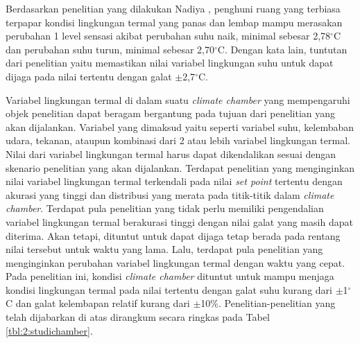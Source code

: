 Berdasarkan penelitian yang dilakukan Nadiya \cite{skripsiMuna}, penghuni ruang yang terbiasa terpapar kondisi lingkungan termal yang panas dan lembap mampu merasakan perubahan 1 level sensasi akibat perubahan suhu naik, minimal sebesar 2,78$^{\circ}$C dan perubahan suhu turun, minimal sebesar 2,70$^{\circ}$C. Dengan kata lain, tuntutan dari penelitian yaitu memastikan nilai variabel lingkungan suhu untuk dapat dijaga pada nilai tertentu dengan galat $\pm$2,7$^{\circ}$C. 

Variabel lingkungan termal di dalam suatu \textit{climate chamber} yang mempengaruhi objek penelitian dapat beragam bergantung pada tujuan dari penelitian yang akan dijalankan. Variabel yang dimaksud yaitu seperti variabel suhu, kelembaban udara, tekanan, ataupun kombinasi dari 2 atau lebih variabel lingkungan termal. Nilai dari variabel lingkungan termal harus dapat dikendalikan sesuai dengan skenario penelitian yang akan dijalankan. Terdapat penelitian yang menginginkan nilai variabel lingkungan termal terkendali pada nilai \textit{set point} tertentu dengan akurasi yang tinggi dan distribusi yang merata pada titik-titik dalam \textit{climate chamber}. Terdapat pula penelitian yang tidak perlu memiliki pengendalian variabel lingkungan termal berakurasi tinggi dengan nilai galat yang masih dapat diterima. Akan tetapi, dituntut untuk dapat dijaga tetap berada pada rentang nilai tersebut untuk waktu yang lama. Lalu, terdapat pula penelitian yang menginginkan perubahan variabel lingkungan termal dengan waktu yang cepat. Pada penelitian ini, kondisi \textit{climate chamber} dituntut untuk mampu menjaga kondisi lingkungan termal pada nilai tertentu dengan galat suhu kurang dari $\pm$1$^{\circ}$C dan galat kelembapan relatif kurang dari $\pm$10\%. Penelitian-penelitian yang telah dijabarkan di atas dirangkum secara ringkas pada Tabel \ref{tbl:2:studichamber}. 

